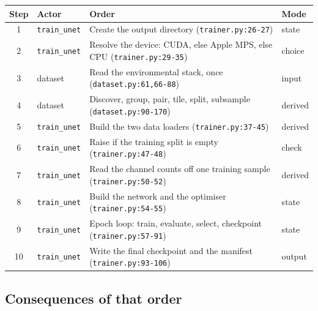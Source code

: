 \documentclass[11pt,a4paper]{article}
\newcommand{\codex}[1]{\texttt{#1}}
\begin{document}
\begin{longtable}{@{}cp{2.4cm}p{8.6cm}p{1.9cm}@{}}
\toprule
Step & Actor & Order & Mode \\
\midrule
\endhead
1 & \codex{train\_\allowbreak{}unet} & Create the output directory (\codex{trainer.py:26-27}) & state \\
2 & \codex{train\_\allowbreak{}unet} & Resolve the device: CUDA, else Apple MPS, else CPU (\codex{trainer.py:29-35}) & choice \\
3 & dataset & Read the environmental stack, once (\codex{dataset.py:61,66-88}) & input \\
4 & dataset & Discover, group, pair, tile, split, subsample (\codex{dataset.py:90-170}) & derived \\
5 & \codex{train\_\allowbreak{}unet} & Build the two data loaders (\codex{trainer.py:37-45}) & derived \\
6 & \codex{train\_\allowbreak{}unet} & Raise if the training split is empty (\codex{trainer.py:47-48}) & check \\
7 & \codex{train\_\allowbreak{}unet} & Read the channel counts off one training sample (\codex{trainer.py:50-52}) & derived \\
8 & \codex{train\_\allowbreak{}unet} & Build the network and the optimiser (\codex{trainer.py:54-55}) & state \\
9 & \codex{train\_\allowbreak{}unet} & Epoch loop: train, evaluate, select, checkpoint (\codex{trainer.py:57-91}) & state \\
10 & \codex{train\_\allowbreak{}unet} & Write the final checkpoint and the manifest (\codex{trainer.py:93-106}) & output \\
\bottomrule
\end{longtable}

\subsection{Consequences of that order}
\end{document}
